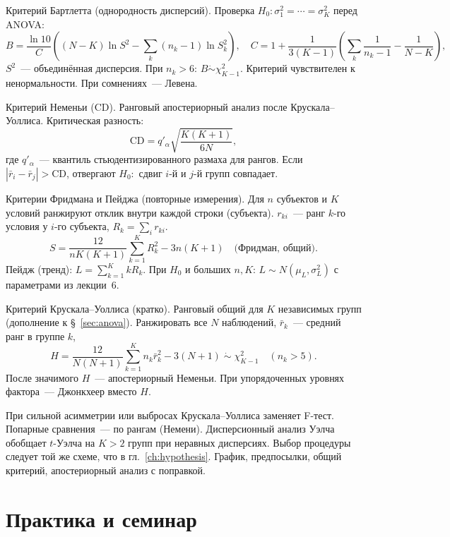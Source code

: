 Критерий Бартлетта (однородность дисперсий). Проверка $H_0\colon\sigma_1^2=\cdots=\sigma_K^2$ перед ANOVA: \[ B = \frac{\ln 10}{C}\left((N-K)\ln S^2 - \sum_k (n_k-1)\ln S_k^2\right), \quad C = 1+\frac{1}{3(K-1)}\left(\sum_k\frac{1}{n_k-1}-\frac{1}{N-K}\right), \] $S^2$~--- объединённая дисперсия. При $n_k>6$: $B\dot\sim\chi^2_{K-1}$.
Критерий чувствителен к ненормальности. При сомнениях~--- Левена.

Критерий Неменьи (CD). Ранговый апостериорный анализ после Крускала--Уоллиса. Критическая разность: \[ \mathrm{CD} = q'_\alpha\sqrt{\frac{K(K+1)}{6N}}, \] где $q'_\alpha$~--- квантиль стьюдентизированного размаха для рангов.
Если $|\bar r_i-\bar r_j|>\mathrm{CD}$, отвергают $H_0\colon$ сдвиг $i$-й и $j$-й групп совпадает.

Критерии Фридмана и Пейджа (повторные измерения). Для $n$ субъектов и $K$ условий ранжируют отклик внутри каждой строки (субъекта). $r_{ki}$~--- ранг $k$-го условия у $i$-го субъекта, $R_k=\sum_i r_{ki}$.
\[ S = \frac{12}{nK(K+1)}\sum_{k=1}^K R_k^2 - 3n(K+1) \quad\text{(Фридман, общий)}.
\] Пейдж (тренд): $L=\sum_{k=1}^K k R_k$. При $H_0$ и больших $n,K$: $L\sim N(\mu_L,\sigma_L^2)$ с параметрами из лекции~6.

Критерий Крускала--Уоллиса (кратко). Ранговый общий для $K$ независимых групп (дополнение к \S~\ref{sec:anova}). Ранжировать все $N$ наблюдений, $\bar r_k$~--- средний ранг в группе $k$, \[ H = \frac{12}{N(N+1)}\sum_{k=1}^K n_k\bar r_k^2 - 3(N+1) \;\dot\sim\;\chi^2_{K-1}\quad (n_k>5).
\] После значимого $H$~--- апостериорный Неменьи. При упорядоченных уровнях фактора~--- Джонкхеер вместо $H$.

При сильной асимметрии или выбросах Крускала--Уоллиса заменяет F-тест. Попарные сравнения~--- по рангам (Немени).
Дисперсионный анализ Уэлча обобщает $t$-Уэлча на $K>2$ групп при неравных дисперсиях.
Выбор процедуры следует той же схеме, что в гл.~\ref{ch:hypothesis}. График, предпосылки, общий критерий, апостериорный анализ с поправкой.

\section{Практика и семинар}
\label{sec:practice-ch4}



